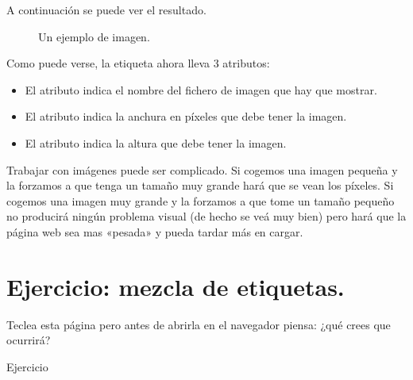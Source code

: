 \documentclass[a4paper,12pt,spanish]{sphinxmanual}
\begin{document}
A continuación se puede ver el resultado.

\begin{figure}[htbp]
\centering
\capstart

\noindent{}
\caption{Un ejemplo de imagen.}\label{\detokenize{index:id14}}\end{figure}

Como puede verse, la etiqueta  ahora lleva 3 atributos:
\begin{itemize}
\item {} 
El atributo  indica el nombre del fichero de imagen que hay que mostrar.

\item {} 
El atributo  indica la anchura en píxeles que debe tener la imagen.

\item {} 
El atributo  indica la altura que debe tener la imagen.

\end{itemize}

Trabajar con imágenes puede ser complicado. Si cogemos una imagen pequeña y la forzamos a que tenga un tamaño muy grande hará que se vean los píxeles. Si cogemos una imagen muy grande y la forzamos a que tome un tamaño pequeño no producirá ningún problema visual (de hecho se veá muy bien) pero hará que la página web sea mas «pesada» y pueda tardar más en cargar.


\section{Ejercicio: mezcla de etiquetas.}
\label{\detokenize{index:ejercicio-mezcla-de-etiquetas}}
Teclea esta página pero antes de abrirla en el navegador piensa: ¿qué crees que ocurrirá?

%
\begin{sphinxVerbatim}[commandchars=\\\{\}]
    Ejercicio
     
           
\end{sphinxVerbatim}



\renewcommand{\indexname}{Índice}
\printindex
\end{document}

